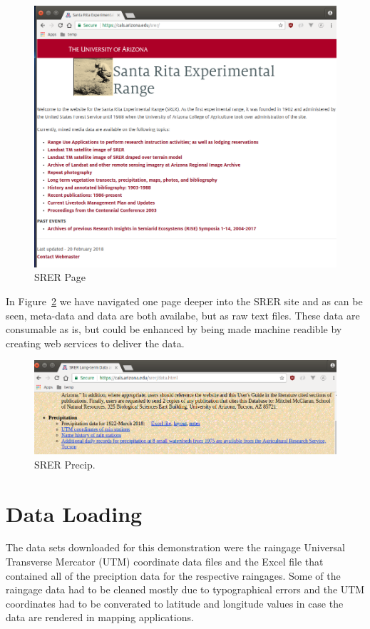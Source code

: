 \begin{figure}[htb]
  \centering\includegraphics[width=\columnwidth]{./images/srerlandingpage.png}
  \caption{SRER Page\cite{hid505SrerWebSite2018}}\label{f:srer_landing_page}
\end{figure}


In Figure~\ref{f:srerprecipdata} we have navigated one page deeper into 
the SRER site and as can be seen, meta-data and data are both availabe, but as 
raw text files.  These data are consumable as is, but could be enhanced by 
being made machine readible by creating web services to deliver the data.

\begin{figure}[htb]
  \centering\includegraphics[width=\columnwidth]{./images/srerprecipdata.png}
  \caption{SRER Precip.\cite{hid505SrerWebSite2018}}\label{f:srerprecipdata}
\end{figure}

\section{Data Loading}
The data sets downloaded for this demonstration were the raingage Universal 
Transverse Mercator (UTM) coordinate data files and the Excel file that 
contained all of the preciption data for the respective raingages.  Some of 
the raingage data had to be cleaned mostly due to typographical errors and the 
UTM coordinates had to be converated to latitude and longitude values in case 
the data are rendered in mapping applications.

